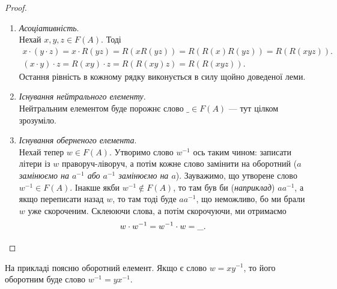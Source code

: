 \documentclass{math_library}
\begin{document}
\begin{proof}
\begin{enumerate}[topsep=0pt, label={\Roman*.}, wide=0pt]
\item \textit{Асоціативність}.\\
Нехай $x,y,z \in F(A)$. Тоді
\begin{align*}
x \cdot (y \cdot z) = x \cdot R(yz) = R(x R(yz)) = R(R(x) R(yz)) = R(R(xyz)).\\
(x \cdot y) \cdot z = R(xy) \cdot z = R(R(xy)z) = R(R(xyz)).
\end{align*}
Остання рівність в кожному рядку виконується в силу щойно доведеної леми.

\item \textit{Існування нейтрального елементу}.\\
Нейтральним елементом буде порожнє слово $\_ \in F(A)$ --- тут цілком зрозуміло.

\item \textit{Існування оберненого елемента}.\\
Нехай тепер $w \in F(A)$. Утворимо слово $w^{-1}$ ось таким чином: записати літери із $w$ праворуч-ліворуч, а потім кожне слово замінити на оборотний (\textit{$a$ замінюємо на $a^{-1}$ або $a^{-1}$ замінюємо на $a$}). Зауважимо, що утворене слово $w^{-1} \in F(A)$. Інакше якби $w^{-1} \notin F(A)$, то там був би (\textit{наприклад}) $aa^{-1}$, а якщо переписати назад $w$, то там тоді буде $aa^{-1}$, що неможливо, бо ми брали $w$ уже скороченим. Склеюючи слова, а потім скорочуючи, ми отримаємо
\[ 
w \cdot w^{-1} = w^{-1} \cdot w = \_. \qedhere
\]
\end{enumerate}
\end{proof}

\begin{example}
На прикладі поясню оборотний елемент. Якщо є слово $w = xy^{-1}$, то його оборотним буде слово $w^{-1} = yx^{-1}$.
\end{example}
\end{document}
